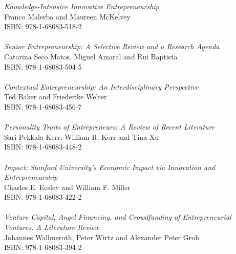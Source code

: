 \vspace{12pt}
\noindent \textit{Knowledge-Intensive Innovative Entrepreneurship}\\
Franco Malerba and Maureen McKelvey\\
ISBN: 978-1-68083-518-2\\
\\
\noindent \textit{Senior Entrepreneurship: A Selective Review and a Research Agenda}\\
Catarina Seco Matos, Miguel Amaral and Rui Baptista\\
ISBN: 978-1-68083-504-5\\
\\
\noindent \textit{Contextual Entrepreneurship: An Interdisciplinary Perspective}\\
Ted Baker and Friederike Welter\\
ISBN: 978-1-68083-456-7\\
\\
\noindent \textit{Personality Traits of Entrepreneurs: A Review of Recent Literature}\\
Sari Pekkala Kerr, William R. Kerr and Tina Xu\\
ISBN: 978-1-68083-448-2\\
\\
\noindent \textit{Impact: Stanford University’s Economic Impact via Innovation and Entrepreneurship}\\
Charles E. Eesley and William F. Miller\\
ISBN: 978-1-68083-422-2\\
\\
\noindent \textit{Venture Capital, Angel Financing, and Crowdfunding of Entrepreneurial Ventures: A Literature Review}\\
Johannes Wallmeroth, Peter Wirtz and Alexander Peter Groh\\
ISBN: 978-1-68083-394-2